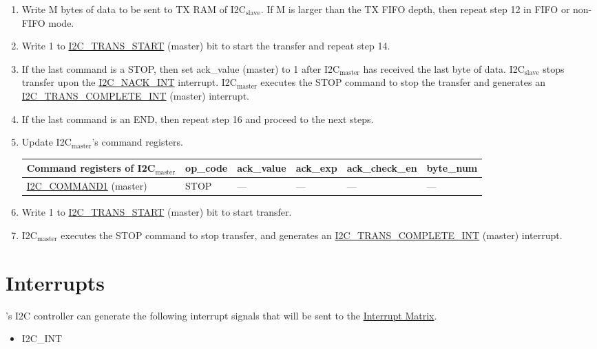 \documentclass[main\_\_EN.tex]{subfiles}
\begin{document}
\begin{enumerate}
\item Write M bytes of data to be sent to TX RAM of I2C$_\text{slave}$. If M is larger than the TX FIFO depth, then repeat step 12 in FIFO or non-FIFO mode.
\item Write 1 to \hyperref[fielddesc:I2CTRANSSTART]{I2C\_TRANS\_START} (master) bit to start the transfer and repeat step 14.
\item If the last command is a STOP, then set ack\_value (master) to 1 after I2C$_\text{master}$ has received the last byte of data. I2C$_\text{slave}$ stops transfer upon the \hyperref[int:i2c-nack]{I2C\_NACK\_INT} interrupt. I2C$_\text{master}$ executes the STOP command to stop the transfer and generates an \hyperref[int:i2c-trans-complete]{I2C\_TRANS\_COMPLETE\_INT} (master) interrupt.
\item If the last command is an END, then repeat step 16 and proceed to the next steps.
\item Update I2C$_\text{master}$'s command registers.
\begin{longtable}{ | p{5cm} | p{1.5cm} | p{1.5cm} | p{1.5cm} |p{2.5cm} | p{1.5cm}|}
\hline\rowcolor{lightgray}
Command registers of I2C$_\text{master}$& op\_code & ack\_value&ack\_exp&ack\_check\_en&byte\_num  \\ \hline
\hyperref[fielddesc:I2CCOMMAND1]{I2C\_COMMAND1} (master)& STOP& ---&---&---&---  \\ \hline
\end{longtable}
\item Write 1 to \hyperref[fielddesc:I2CTRANSSTART]{I2C\_TRANS\_START} (master) bit to start transfer.
\item I2C$_\text{master}$ executes the STOP command to stop transfer, and generates an \hyperref[int:i2c-trans-complete]{I2C\_TRANS\_COMPLETE\_INT} (master) interrupt.

\end{enumerate}

\section{Interrupts}\label{sub:i2c-int}


\chipname{}'s I2C controller can generate the following interrupt signals that will be sent to the \hyperref[mod:intmtrx]{Interrupt Matrix}.

    \begin{itemize}
        \item I2C\_INT
    \end{itemize}
\end{document}
